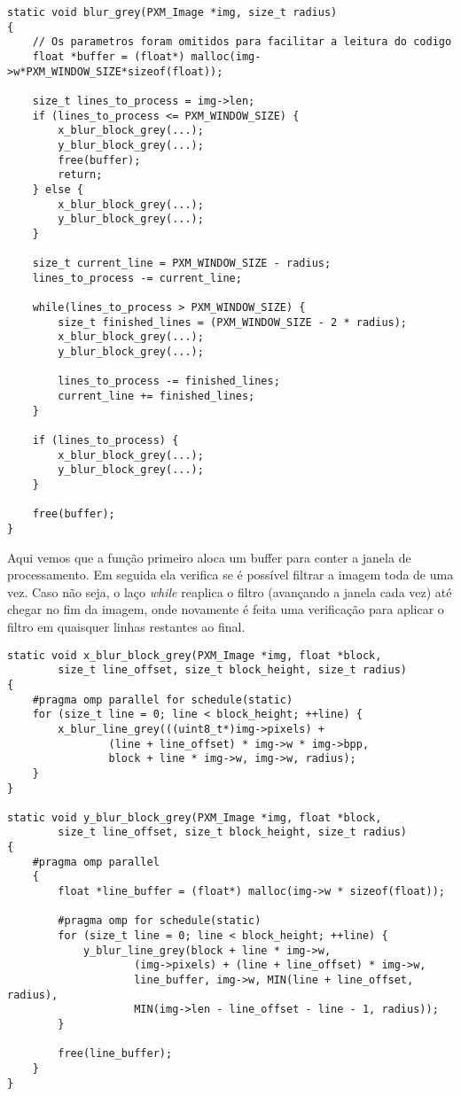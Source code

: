 \documentclass[11pt,towside]{article}
\begin{document}
\break
\begin{lstlisting}
static void blur_grey(PXM_Image *img, size_t radius)
{
	// Os parametros foram omitidos para facilitar a leitura do codigo
	float *buffer = (float*) malloc(img->w*PXM_WINDOW_SIZE*sizeof(float));

    size_t lines_to_process = img->len;
    if (lines_to_process <= PXM_WINDOW_SIZE) {
        x_blur_block_grey(...);
        y_blur_block_grey(...);
        free(buffer);
        return;
    } else {
        x_blur_block_grey(...);
        y_blur_block_grey(...);
    }

    size_t current_line = PXM_WINDOW_SIZE - radius;
    lines_to_process -= current_line;

    while(lines_to_process > PXM_WINDOW_SIZE) {
        size_t finished_lines = (PXM_WINDOW_SIZE - 2 * radius);
        x_blur_block_grey(...);
        y_blur_block_grey(...);

        lines_to_process -= finished_lines;
        current_line += finished_lines;
    }

    if (lines_to_process) {
        x_blur_block_grey(...);
        y_blur_block_grey(...);
    }
    
    free(buffer);
}
\end{lstlisting}

Aqui vemos que a função primeiro aloca um buffer para conter a janela de processamento. Em seguida ela verifica se é possível filtrar a imagem toda de uma vez. Caso não seja, o laço \emph{while} reaplica o filtro (avançando a janela cada vez) até chegar no fim da imagem, onde novamente é feita uma verificação para aplicar o filtro em quaisquer linhas restantes ao final.

\break

\begin{lstlisting}
static void x_blur_block_grey(PXM_Image *img, float *block,
        size_t line_offset, size_t block_height, size_t radius)
{
    #pragma omp parallel for schedule(static)
    for (size_t line = 0; line < block_height; ++line) {
        x_blur_line_grey(((uint8_t*)img->pixels) +
                (line + line_offset) * img->w * img->bpp,
                block + line * img->w, img->w, radius);
    }
}

static void y_blur_block_grey(PXM_Image *img, float *block,
        size_t line_offset, size_t block_height, size_t radius)
{
    #pragma omp parallel
    {
        float *line_buffer = (float*) malloc(img->w * sizeof(float));

        #pragma omp for schedule(static)
        for (size_t line = 0; line < block_height; ++line) {
            y_blur_line_grey(block + line * img->w,
                    (img->pixels) + (line + line_offset) * img->w,
                    line_buffer, img->w, MIN(line + line_offset, radius),
                    MIN(img->len - line_offset - line - 1, radius));
        }

        free(line_buffer);
    }
}
\end{lstlisting}
\end{document}
